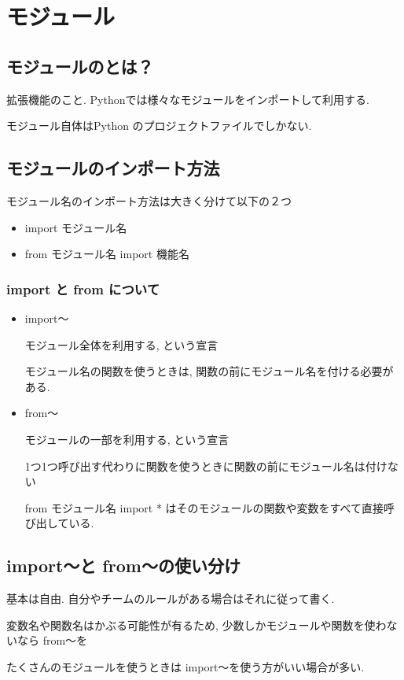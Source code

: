 \documentclass{jsarticle}
\begin{document}

\section{モジュール}
\subsection{モジュールのとは？}
拡張機能のこと. Pythonでは様々なモジュールをインポートして利用する.  \par
モジュール自体はPython のプロジェクトファイルでしかない.
\subsection{モジュールのインポート方法}
モジュール名のインポート方法は大きく分けて以下の２つ
\begin{itemize}
	\item{import モジュール名}
	\item{from モジュール名 import 機能名}
\end{itemize}
\subsubsection{import と from について}
\begin{itemize}
	\item{import～} \par
	モジュール全体を利用する, という宣言 \par
	モジュール名の関数を使うときは, 関数の前にモジュール名を付ける必要がある.
	\item{from～} \par
	モジュールの一部を利用する, という宣言 \par
	1つ1つ呼び出す代わりに関数を使うときに関数の前にモジュール名は付けない \par
	from モジュール名 import * はそのモジュールの関数や変数をすべて直接呼び出している.
\end{itemize}

\subsection{import～と from～の使い分け}
基本は自由. 自分やチームのルールがある場合はそれに従って書く. \par
変数名や関数名はかぶる可能性が有るため, 少数しかモジュールや関数を使わないなら from～を \par
たくさんのモジュールを使うときは import～を使う方がいい場合が多い.
\end{document}
